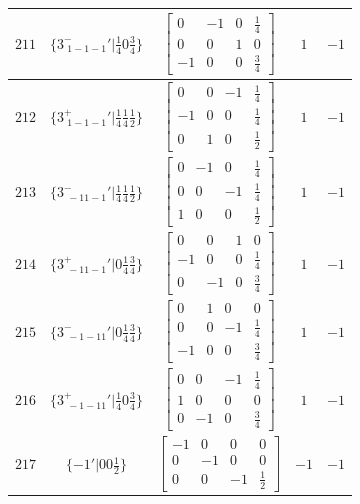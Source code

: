 \documentclass[fleqn,8pt]{jsarticle}
\begin{document}
\begin{longtable}{ccccc}
$ 211 $ & $ \{3^{-}_{\,\,1-1-1}{}'|\frac{1}{4} 0 \frac{3}{4}\} $ & $ \begin{bmatrix} 0 & -1 & 0 & \frac{1}{4} \\ 0 & 0 & 1 & 0 \\ -1 & 0 & 0 & \frac{3}{4} \end{bmatrix} $ & $ 1 $ & $ -1 $ \\ \hline
$ 212 $ & $ \{3^{+}_{\,\,1-1-1}{}'|\frac{1}{4} \frac{1}{4} \frac{1}{2}\} $ & $ \begin{bmatrix} 0 & 0 & -1 & \frac{1}{4} \\ -1 & 0 & 0 & \frac{1}{4} \\ 0 & 1 & 0 & \frac{1}{2} \end{bmatrix} $ & $ 1 $ & $ -1 $ \\ \hline
$ 213 $ & $ \{3^{-}_{\,\,-11-1}{}'|\frac{1}{4} \frac{1}{4} \frac{1}{2}\} $ & $ \begin{bmatrix} 0 & -1 & 0 & \frac{1}{4} \\ 0 & 0 & -1 & \frac{1}{4} \\ 1 & 0 & 0 & \frac{1}{2} \end{bmatrix} $ & $ 1 $ & $ -1 $ \\ \hline
$ 214 $ & $ \{3^{+}_{\,\,-11-1}{}'|0 \frac{1}{4} \frac{3}{4}\} $ & $ \begin{bmatrix} 0 & 0 & 1 & 0 \\ -1 & 0 & 0 & \frac{1}{4} \\ 0 & -1 & 0 & \frac{3}{4} \end{bmatrix} $ & $ 1 $ & $ -1 $ \\ \hline
$ 215 $ & $ \{3^{-}_{\,\,-1-11}{}'|0 \frac{1}{4} \frac{3}{4}\} $ & $ \begin{bmatrix} 0 & 1 & 0 & 0 \\ 0 & 0 & -1 & \frac{1}{4} \\ -1 & 0 & 0 & \frac{3}{4} \end{bmatrix} $ & $ 1 $ & $ -1 $ \\ \hline
$ 216 $ & $ \{3^{+}_{\,\,-1-11}{}'|\frac{1}{4} 0 \frac{3}{4}\} $ & $ \begin{bmatrix} 0 & 0 & -1 & \frac{1}{4} \\ 1 & 0 & 0 & 0 \\ 0 & -1 & 0 & \frac{3}{4} \end{bmatrix} $ & $ 1 $ & $ -1 $ \\ \hline
$ 217 $ & $ \{-1{}'|0 0 \frac{1}{2}\} $ & $ \begin{bmatrix} -1 & 0 & 0 & 0 \\ 0 & -1 & 0 & 0 \\ 0 & 0 & -1 & \frac{1}{2} \end{bmatrix} $ & $ -1 $ & $ -1 $ \\ \hline

\end{longtable}
\end{document}

